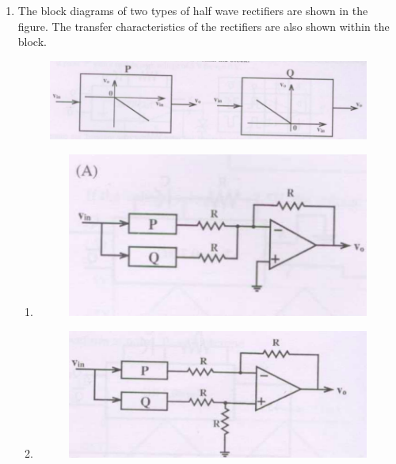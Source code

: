 \documentclass[journal,12pt,onecolumn]{IEEEtran}
\theoremstyle{remark}
\begin{document}
\begin{enumerate}[start=1, label=Q.\arabic*]
\begin{multicols}{2}
\begin{enumerate}
    \item $v_{C1}=10$V, $v_{C2}=5$V
    \item $v_{C1}=10$V, $v_{C2}=-5$V
    \item $v_{C1}=5$V, $v_{C2}=10$V
    \item $v_{C1}=5$V, $v_{C2}=-10$V
\end{enumerate}
\end{multicols}
\hfill (GATE EE 2008)


\item  The block diagrams of two types of half wave rectifiers are shown in the figure. The transfer characteristics of the rectifiers are also shown within the block.
\begin{figure}[H]
    \centering
    \includegraphics[width=\columnwidth]{Fig/q42.png}
    \caption{}
\end{figure}
\begin{enumerate}
\item 
\begin{figure}[H]
    \centering
    \includegraphics[width=\columnwidth]{Fig/q41-A.png}
    \caption{}
\end{figure}
\item \begin{figure}[H]
    \centering
    \includegraphics[width=\columnwidth]{Fig/q41-B.png}

\end{figure}
\end{enumerate}
\end{enumerate}
\end{document}
